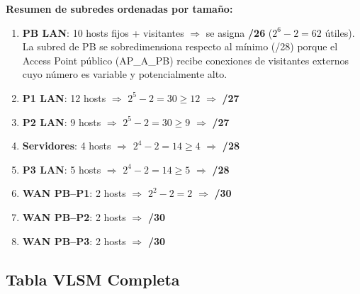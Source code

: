\documentclass[letterpaper,11pt]{article}
\begin{document}
\textbf{Resumen de subredes ordenadas por tamaño:}

\begin{enumerate}
    \item \textbf{PB LAN}: 10 hosts fijos + visitantes $\Rightarrow$ se asigna \textbf{/26} ($2^6 - 2 = 62$ útiles). La subred de PB se sobredimensiona respecto al mínimo (/28) porque el Access Point público (AP\_A\_PB) recibe conexiones de visitantes externos cuyo número es variable y potencialmente alto.
    \item \textbf{P1 LAN}: 12 hosts $\Rightarrow$ $2^5 - 2 = 30 \geq 12$ $\Rightarrow$ \textbf{/27}
    \item \textbf{P2 LAN}: 9 hosts $\Rightarrow$ $2^5 - 2 = 30 \geq 9$ $\Rightarrow$ \textbf{/27}
    \item \textbf{Servidores}: 4 hosts $\Rightarrow$ $2^4 - 2 = 14 \geq 4$ $\Rightarrow$ \textbf{/28}
    \item \textbf{P3 LAN}: 5 hosts $\Rightarrow$ $2^4 - 2 = 14 \geq 5$ $\Rightarrow$ \textbf{/28}
    \item \textbf{WAN PB--P1}: 2 hosts $\Rightarrow$ $2^2 - 2 = 2$ $\Rightarrow$ \textbf{/30}
    \item \textbf{WAN PB--P2}: 2 hosts $\Rightarrow$ \textbf{/30}
    \item \textbf{WAN PB--P3}: 2 hosts $\Rightarrow$ \textbf{/30}
\end{enumerate}

\subsection{Tabla VLSM Completa}
\end{document}
